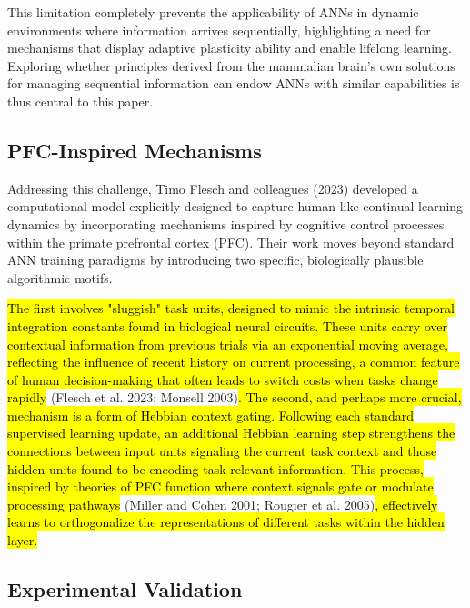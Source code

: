 \documentclass[
10pt, %
a4paper, %
oneside, %
headinclude,footinclude, %
BCOR5mm, %
]{scrartcl}
\begin{document}
This limitation completely prevents the applicability of ANNs in dynamic environments where information arrives sequentially, highlighting a need for mechanisms that display adaptive plasticity ability and enable lifelong learning. Exploring whether principles derived from the mammalian brain's own solutions for managing sequential information can endow ANNs with similar capabilities is thus central to this paper.

\subsection{PFC-Inspired Mechanisms}

Addressing this challenge, Timo Flesch and colleagues (2023) developed a computational model explicitly designed to capture human-like continual learning dynamics by incorporating mechanisms inspired by cognitive control processes within the primate prefrontal cortex (PFC). Their work moves beyond standard ANN training paradigms by introducing two specific, biologically plausible algorithmic motifs.

\hl{The first involves "sluggish" task units, designed to mimic the intrinsic temporal integration constants found in biological neural circuits. These units carry over contextual information from previous trials via an exponential moving average, reflecting the influence of recent history on current processing, a common feature of human decision-making that often leads to switch costs when tasks change rapidly }(Flesch et al. 2023; Monsell 2003)\hl{. The second, and perhaps more crucial, mechanism is a form of Hebbian context gating. Following each standard supervised learning update, an additional Hebbian learning step strengthens the connections between input units signaling the current task context and those hidden units found to be encoding task-relevant information. This process, inspired by theories of PFC function where context signals gate or modulate processing pathways }(Miller and Cohen 2001; Rougier et al. 2005)\hl{, effectively learns to orthogonalize the representations of different tasks within the hidden layer.}

\subsection{Experimental Validation}
\end{document}
